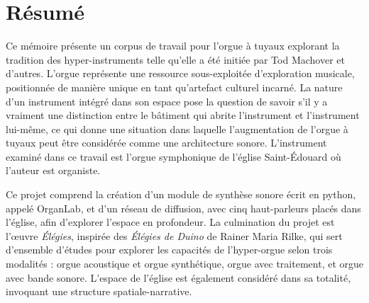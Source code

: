 \documentclass[12pt,twoside,maitrise]{dms_ks}
\theoremstyle{definition}
\begin{document}

\maketitle

\maketitle


\francais

\chapter*{Résumé}

Ce mémoire présente un corpus de travail pour l'orgue à tuyaux explorant la tradition des hyper-instruments telle qu'elle a été initiée par Tod Machover et d'autres. 
L'orgue représente une ressource sous-exploitée d'exploration musicale, positionnée de manière unique en tant qu'artefact culturel incarné. 
La nature d'un instrument intégré dans son espace pose la question de savoir s'il y a vraiment une distinction entre le bâtiment qui abrite l'instrument et l'instrument lui-même, ce qui donne une situation dans laquelle l'augmentation de l'orgue à tuyaux peut être considérée comme une architecture sonore. 
L'instrument examiné dans ce travail est l'orgue symphonique de l’église Saint-Édouard où l'auteur est organiste. 

Ce projet comprend la création d'un module de synthèse sonore écrit en python, appelé OrganLab, et d'un réseau de diffusion, avec cinq haut-parleurs placés dans l'église, afin d'explorer l'espace en profondeur. 
La culmination du projet est l'œuvre \textit{Élégies}, inspirée des \textit{Élégies de Duino} de Rainer Maria Rilke, qui sert d'ensemble d'études pour explorer les capacités de l'hyper-orgue selon trois modalités : orgue acoustique et orgue synthétique, orgue avec traitement, et orgue avec bande sonore. 
L'espace de l'église est également considéré dans sa totalité, invoquant une structure spatiale-narrative. 
\end{document}
